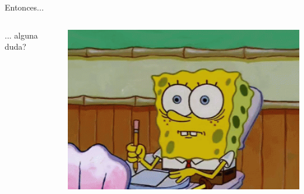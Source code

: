 
\begin{frame}{Entonces...}

    \begin{columns}[T]
        \begin{column}{0.4\linewidth}
            \vspace{3.3cm}

            \Huge ... alguna duda?
        \end{column}
        \begin{column}{0.58\linewidth}
            
            \includegraphics[height=0.8\textheight, width=\linewidth]{img/doubts.png}
        \end{column}
        
    \end{columns}
    
\end{frame}